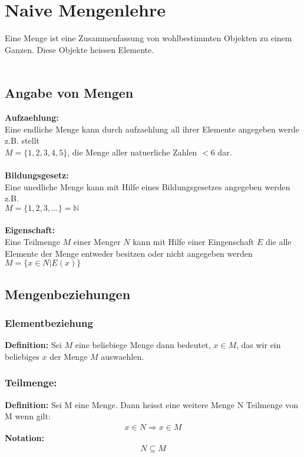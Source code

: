 \documentclass[../AbiMappe_Mathe.tex]{subfiles}
\begin{document}
\theoremstyle{nonumberplain}



\section{Naive Mengenlehre}
Eine Menge ist eine Zusammenfassung von wohlbestimmten Objekten zu einem Ganzen.
Diese Objekte heissen Elemente.\\\\


\subsection{Angabe von Mengen}
\textbf{Aufzaehlung:}\\
Eine endliche Menge kann durch aufzaehlung all ihrer Elemente angegeben werde z.B. stellt\\ $M=\{1,2,3,4,5\}$, die Menge aller natuerliche Zahlen $<6$ dar.\\\\
\textbf{Bildungsgesetz:}\\
Eine unedliche Menge kann mit Hilfe eines Bildungsgesetzes angegeben werden z.B. \\$M=\{1,2,3,\dots\}=\mathbb{N}$\\\\
\textbf{Eigenschaft:}\\
Eine Teilmenge $M$ einer Menger $N$ kann mit Hilfe einer Eingenschaft $E$ die alle Elemente der Menge entweder besitzen oder nicht angegeben werden $M=\{x \in N|E(x)\}$

\subsection{Mengenbeziehungen}

\subsubsection{Elementbeziehung}
\textbf{Definition:} Sei $M$ eine beliebiege Menge dann bedeutet, $x \in M$, das wir ein beliebiges $x$ der Menge $M$ auswaehlen.

\subsubsection{Teilmenge:}
\textbf{Definition:} Sei M eine Menge. Dann heisst eine weitere Menge N Teilmenge von M wenn gilt:
\begin{align*}
x \in N \Rightarrow x \in M
\end{align*}
\textbf{Notation:} 
\begin{align*}
N \subseteq M
\end{align*}
\end{document}
